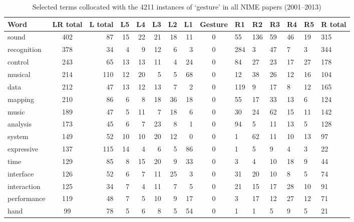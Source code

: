 \begin{table*}[htbp]
\centering
{}
\caption{Selected terms collocated with the 4211 instances of `gesture' in all NIME papers (2001--2013)}
\vspace{3pt} \noindent
\begin{small}
\begin{tabular}{lcrrrrrrcllllll}
\midrule
\multicolumn{1}{l}{\textbf{Word}} & \multicolumn{1}{c}{\textbf{LR total}} & \multicolumn{1}{c}{\textbf{L total}} & \multicolumn{1}{c}{\textbf{L5}} & \multicolumn{1}{c}{\textbf{L4}} & \multicolumn{1}{c}{\textbf{L3}} & \multicolumn{1}{c}{\textbf{L2}} & \multicolumn{1}{c}{\textbf{L1}} & \multicolumn{1}{c}{\textbf{Gesture}} & \textbf{R1} & \textbf{R2} & \textbf{R3} & \textbf{R4} & \textbf{R5} & \textbf{R total} \\
\toprule  
sound & 402 & 87 & 15 & 22 & 21 & 18 & 11 & 0 & 55 & 136 & 59 & 46 & 19 & 315 \\
recognition & 378 & 34 & 4 & 9 & 12 & 6 & 3 & 0 & 284 & 3 & 47 & 7 & 3 & 344 \\
control & 243 & 65 & 13 & 13 & 11 & 4 & 24 & 0 & 84 & 27 & 23 & 17 & 27 & 178 \\
musical & 214 & 110 & 12 & 20 & 5 & 5 & 68 & 0 & 12 & 38 & 26 & 12 & 16 & 104 \\
data & 212 & 47 & 13 & 12 & 13 & 7 & 2 & 0 & 119 & 9 & 17 & 8 & 12 & 165 \\
mapping & 210 & 86 & 6 & 8 & 18 & 36 & 18 & 0 & 55 & 17 & 33 & 13 & 6 & 124 \\
music & 189 & 47 & 5 & 11 & 7 & 18 & 6 & 0 & 30 & 24 & 62 & 15 & 11 & 142 \\
analysis & 173 & 45 & 6 & 7 & 23 & 8 & 1 & 0 & 94 & 5 & 11 & 13 & 5 & 128 \\
system & 149 & 52 & 10 & 10 & 20 & 12 & 0 & 0 & 1 & 62 & 11 & 10 & 13 & 97 \\
expressive & 137 & 115 & 14 & 4 & 6 & 5 & 86 & 0 & 1 & 5 & 9 & 4 & 3 & 22 \\
time & 129 & 85 & 8 & 15 & 20 & 9 & 33 & 0 & 3 & 4 & 10 & 18 & 9 & 44 \\
interface & 126 & 52 & 6 & 7 & 11 & 25 & 3 & 0 & 31 & 20 & 10 & 8 & 5 & 74 \\
interaction & 125 & 34 & 7 & 4 & 11 & 7 & 5 & 0 & 21 & 15 & 17 & 28 & 10 & 91 \\
performance & 119 & 48 & 7 & 5 & 10 & 9 & 17 & 0 & 3 & 17 & 12 & 27 & 12 & 71 \\
hand & 99 & 78 & 5 & 6 & 8 & 5 & 54 & 0 & 1 & 1 & 5 & 9 & 5 & 21 \\

\end{tabular}
\end{small}
\end{table*}

